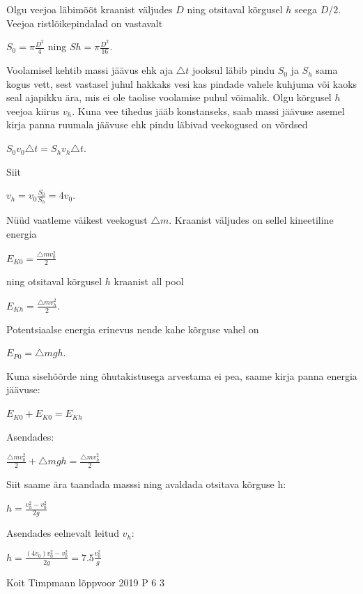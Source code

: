\documentclass[11pt]{article}
\begin{document}
{{\ifSolution
Olgu veejoa läbimõõt kraanist väljudes $D$ ning otsitaval kõrgusel $h$ seega $D/2$. Veejoa ristlõikepindalad on vastavalt 
\begin{center}
$S_0 = \pi \frac{D^2}{4}$ ning $Sh = \pi \frac{D^2}{16}$. 
\end{center}
Voolamisel kehtib massi jäävus ehk aja $\triangle t$ jooksul läbib pindu $S_0$ ja $S_h$ sama kogus vett, sest vastasel juhul hakkaks vesi kas pindade vahele kuhjuma või kaoks seal ajapikku ära, mis ei ole taolise voolamise puhul võimalik. Olgu kõrgusel $h$ veejoa kiirus $v_h$. Kuna vee tihedus jääb konstanseks, saab massi jäävuse asemel kirja panna ruumala jäävuse ehk pindu läbivad veekogused on võrdsed
\begin{center}
$S_0 v_0 \triangle t = S_h v_h \triangle t$. 
\end{center}
Siit 
\begin{center}
$v_h = v_0 \frac{S_0}{S_h} = 4v_0$.
\end{center}
Nüüd vaatleme väikest veekogust $\triangle m $. Kraanist väljudes on sellel kineetiline energia
\begin{center}
$E_{K0} = \frac{\triangle m v_0 ^2}{2}$
\end{center}
ning otsitaval kõrgusel $h$ kraanist all pool
\begin{center}
$E_{Kh} = \frac{\triangle mv_h ^2}{2}$.
\end{center}
Potentsiaalse energia erinevus nende kahe kõrguse vahel on 
\begin{center}
$E_{P0} = \triangle mgh$.
\end{center}
Kuna sisehõõrde ning õhutakistusega arvestama ei pea, saame kirja panna energia jäävuse:
\begin{center}
$E_{K0} + E_{K0} = E_{Kh}$
\end{center}
Asendades:
\begin{center}
$\frac{\triangle mv_0 ^2}{2} + \triangle mgh = \frac{\triangle mv_h ^2}{2}$
\end{center}
Siit saame ära taandada masssi ning avaldada otsitava kõrguse h:
\begin{center}
$h = \frac{v_h ^2 - v_0 ^2}{2g}$
\end{center}
Asendades eelnevalt leitud $v_h$:
\begin{center}
$h = \frac{(4v_0)v_0 ^2 - v_0 ^2}{2g} = 7.5 \frac{ v_0 ^2}{g}$
\end{center}
\fi
}

{Koit Timpmann} %
{lõppvoor} %
{2019} %
{P 6} %
{3} %
{

}}
\end{document}
